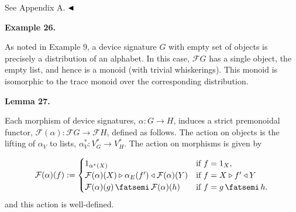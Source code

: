\documentclass[10pt,a4paper]{article}
\begin{document}
 
See Appendix A. $\hfill\blacktriangleleft$\par
 
 
 
\par\medskip\noindent\textbf{Example 26.}\par
 
 
As noted in Example 9, a device signature $G$ with empty set of objects is precisely a distribution of an alphabet. In this case, $\mathcal{F}G$ has a single object, the empty list, and hence is a monoid (with trivial whiskerings). This monoid is isomorphic to the trace monoid over the corresponding distribution.\par
 
 
 
 
\par\medskip\noindent\textbf{Lemma 27.}\par
 
 
Each morphism of device signatures, $\alpha:G\to H$, induces a strict premonoidal functor, $\mathcal{F}(\alpha):\mathcal{F}G\to\mathcal{F}H$, defined as follows. The action on objects is the lifting of $\alpha_{V}$ to lists, $\alpha_{V}^{*}:V_{G}^{*}\to V_{H}^{*}$. The action on morphisms is given by\par
    \[\mathcal{F}(\alpha)(f):=\begin{cases}1_{\alpha^{*}(X)}&\text{if $f=1_{X}$},\\
\mathcal{F}(\alpha)(X)\triangleright\alpha_{E}(f^{\prime})\triangleleft\mathcal{F}(\alpha)(Y)&\text{if $f=X\triangleright f^{\prime}\triangleleft Y$}\\
\mathcal{F}(\alpha)(g)\mathop{\fatsemi}\mathcal{F}(\alpha)(h)&\text{if $f=g\mathop{\fatsemi}h$.}\\
\end{cases}\]    
and this action is well-defined.\par
 
 
 
 
\end{document}
